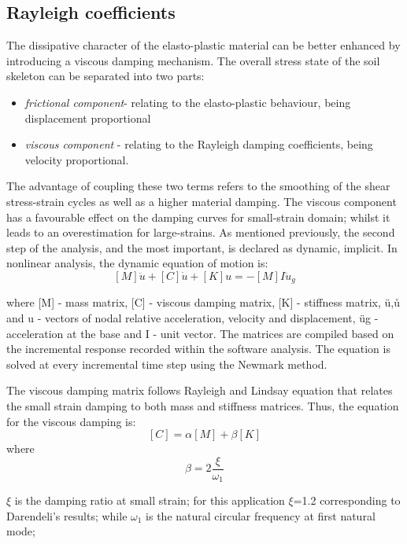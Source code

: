 \documentclass[10pt,a4paper]{report}
\begin{document}
\subsection{Rayleigh coefficients}
The dissipative character of the elasto-plastic material can be better enhanced by introducing a viscous damping mechanism. The overall stress state of the soil skeleton can be separated into two parts: 
		\begin{itemize}
	\item \textit{frictional component}- relating to the elasto-plastic behaviour, being displacement proportional
	\item \textit{viscous component} - relating to the Rayleigh damping coefficients, being velocity proportional. 
\end{itemize}


The advantage of coupling these two terms refers to the smoothing of the shear stress-strain cycles as well as a higher material damping. The viscous component has a favourable effect on the damping curves for small-strain domain; whilst it leads to an overestimation for large-strains. 
As mentioned previously, the second step of the analysis, and the most important, is declared as dynamic, implicit. In nonlinear analysis, the dynamic equation of motion is:
\begin{equation}
\left[M\right]{\ddot{u}}+\left[C\right]{\dot{u}}+\left[K\right]{u}=-\left[M\right]{I}\ddot{u}_g
\end{equation}

where [M] - mass matrix, [C] - viscous damping matrix, [K] - stiffness matrix, {ü},{ů} and {u} - vectors of nodal relative acceleration, velocity and displacement, üg - acceleration at the base and {I} - unit vector. The matrices are compiled based on the incremental response recorded within the software analysis. The equation is solved at every incremental time step using the Newmark method.

The viscous damping matrix follows Rayleigh and Lindsay equation that relates the small strain damping to both mass and stiffness matrices. Thus, the equation for the viscous damping is:
\begin{equation}
	\left[C\right]=\alpha\left[M\right]+\beta\left[K\right]
\end{equation}
where
\begin{equation}
		\beta = 2\frac{\xi}{\omega_1}
\end{equation}


$\xi$ is the damping ratio at small strain; for this application $\xi$=1.2 corresponding to Darendeli's results; while $\omega_1$ is the natural circular frequency at first natural mode;
\end{document}
